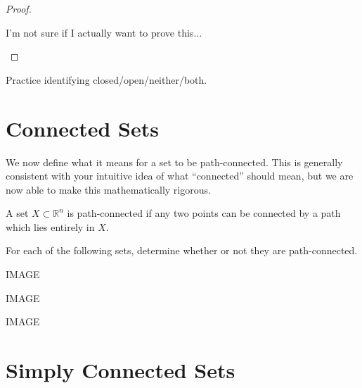 \documentclass{ximera}
\begin{document}
\begin{proof}
\begin{unfoldable}
I'm not sure if I actually want to prove this...
\end{unfoldable}
\end{proof}

\begin{example}
\begin{foldable}
Practice identifying closed/open/neither/both.
\end{foldable}
\end{example}

\section{Connected Sets}

We now define what it means for a set to be path-connected. This is generally consistent with your intuitive idea of what ``connected'' should mean, but we are now able to make this mathematically rigorous.

\begin{definition}
A set $X\subset \mathbb{R}^n$ is path-connected if any two points can be connected by a path which lies entirely in $X$.
\end{definition}

\begin{example}
\begin{foldable}
For each of the following sets, determine whether or not they are path-connected.

IMAGE
\begin{multipleChoice}
\end{multipleChoice}

IMAGE
\begin{multipleChoice}
\end{multipleChoice}

IMAGE
\begin{multipleChoice}
\end{multipleChoice}
\end{foldable}
\end{example}

\section{Simply Connected Sets}
\end{document}
